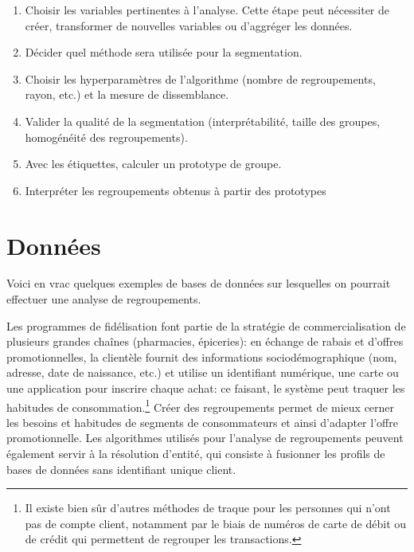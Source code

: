 \documentclass[
  11pt,
  letterpaper,
]{scrbook}
\providecommand{\tightlist}{%
  \setlength{\itemsep}{0pt}\setlength{\parskip}{0pt}}\usepackage{longtable,booktabs,array}
\theoremstyle{definition}
\theoremstyle{remark}
\begin{document}
\begin{tcolorbox}[enhanced jigsaw, coltitle=black, left=2mm, opacitybacktitle=0.6, colback=white, leftrule=.75mm, colframe=quarto-callout-tip-color-frame, toprule=.15mm, colbacktitle=quarto-callout-tip-color!10!white, opacityback=0, bottomtitle=1mm, toptitle=1mm, rightrule=.15mm, title=\textcolor{quarto-callout-tip-color}{\faLightbulb}\hspace{0.5em}{Étapes d'une analyse de regroupements}, breakable, titlerule=0mm, arc=.35mm, bottomrule=.15mm]

\begin{enumerate}
\def\labelenumi{\arabic{enumi}.}
\tightlist
\item
  Choisir les variables pertinentes à l'analyse. Cette étape peut
  nécessiter de créer, transformer de nouvelles variables ou d'aggréger
  les données.
\item
  Décider quel méthode sera utilisée pour la segmentation.
\item
  Choisir les hyperparamètres de l'algorithme (nombre de regroupements,
  rayon, etc.) et la mesure de dissemblance.
\item
  Valider la qualité de la segmentation (interprétabilité, taille des
  groupes, homogénéité des regroupements).
\item
  Avec les étiquettes, calculer un prototype de groupe.
\item
  Interpréter les regroupements obtenus à partir des prototypes
\end{enumerate}

\end{tcolorbox}

\section{Données}\label{donnuxe9es}

Voici en vrac quelques exemples de bases de données sur lesquelles on
pourrait effectuer une analyse de regroupements.

Les programmes de fidélisation font partie de la stratégie de
commercialisation de plusieurs grandes chaînes (pharmacies, épiceries):
en échange de rabais et d'offres promotionnelles, la clientèle fournit
des informations sociodémographique (nom, adresse, date de naissance,
etc.) et utilise un identifiant numérique, une carte ou une application
pour inscrire chaque achat: ce faisant, le système peut traquer les
habitudes de consommation.\footnote{Il existe bien sûr d'autres méthodes
  de traque pour les personnes qui n'ont pas de compte client, notamment
  par le biais de numéros de carte de débit ou de crédit qui permettent
  de regrouper les transactions.} Créer des regroupements permet de
mieux cerner les besoins et habitudes de segments de consommateurs et
ainsi d'adapter l'offre promotionnelle. Les algorithmes utilisés pour
l'analyse de regroupements peuvent également servir à la résolution
d'entité, qui consiste à fusionner les profils de bases de données sans
identifiant unique client.
\end{document}
